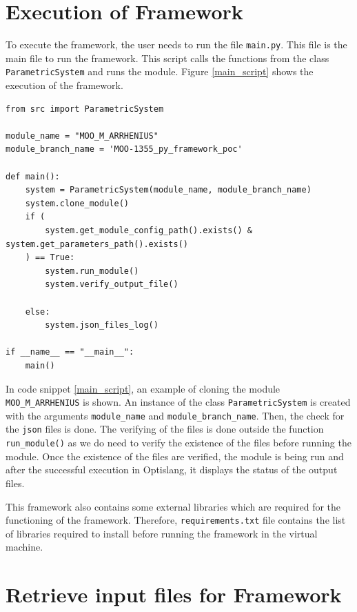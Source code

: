 \section{Execution of Framework}
To execute the framework, the user needs to run the file \texttt{main.py}. This file is the main file to run the framework. This script calls the functions
from the class \texttt{ParametricSystem} and runs the module. Figure \ref{main_script} shows the execution of the framework.
\renewcommand{\lstlistingname}{Code}
\begin{lstlisting}[style=pythoncode, caption={Execution of framework using \texttt{main.py}}, label={main_script}]
from src import ParametricSystem

module_name = "MOO_M_ARRHENIUS"
module_branch_name = 'MOO-1355_py_framework_poc'

def main():
    system = ParametricSystem(module_name, module_branch_name)
    system.clone_module()
    if (
        system.get_module_config_path().exists() & system.get_parameters_path().exists()
    ) == True:
        system.run_module()
        system.verify_output_file()

    else:
        system.json_files_log()

if __name__ == "__main__":
    main()
\end{lstlisting}

In code snippet \ref{main_script}, an example of cloning the module \texttt{MOO\_M\_ARRHENIUS} is shown. An instance of the class \texttt{ParametricSystem} 
is created with the arguments \texttt{module\_name} and \texttt{module\_branch\_name}. Then, the check for the \texttt{\acrshort{json}} files is done. 
The verifying of the files is done outside the function \texttt{run\_module()} as we do need to verify the existence of the files before running the module.
Once the existence of the files are verified, the module is being run and after the successful execution in Optislang, it displays the status of the output
files. 

This framework also contains some external libraries which are required for the functioning of the framework. Therefore, \texttt{requirements.txt} file contains the list of libraries
required to install before running the framework in the virtual machine.


\section{Retrieve input files for Framework} \label{retrieve_input_files}
